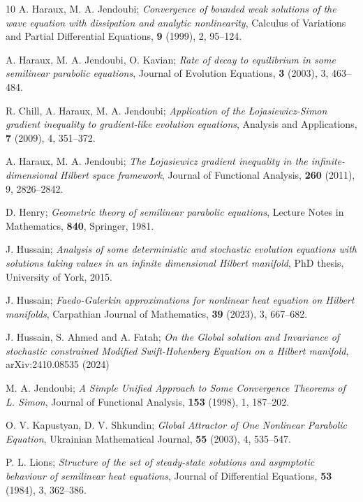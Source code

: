 \documentclass[reqno]{amsart}
\begin{document}
\begin{thebibliography}{10}
 A. Haraux, M. A. Jendoubi;
\emph{Convergence of bounded weak solutions of the wave equation with dissipation
and analytic nonlinearity}, Calculus of Variations and Partial Differential Equations,
\textbf{9} (1999), 2, 95--124.

 A. Haraux, M. A. Jendoubi, O. Kavian;
\emph{Rate of decay to equilibrium in some semilinear parabolic equations},
Journal of Evolution Equations, \textbf{3} (2003), 3, 463--484.

 R. Chill, A. Haraux, M. A. Jendoubi;
\emph{Application of the \L{o}jasiewicz-Simon gradient inequality to gradient-like
evolution equations}, Analysis and Applications, \textbf{7} (2009), 4, 351--372.

 A. Haraux, M. A. Jendoubi;
\emph{The \L{o}jasiewicz gradient inequality in the infinite-dimensional Hilbert
space framework}, Journal of Functional Analysis, \textbf{260} (2011), 9, 2826--2842.

 D. Henry;
\emph{Geometric theory of semilinear parabolic equations},
Lecture Notes in Mathematics, \textbf{840}, Springer, 1981.

 J. Hussain;
\emph{Analysis of some deterministic and stochastic evolution equations with
solutions taking values in an infinite dimensional Hilbert manifold},
PhD thesis, University of York, 2015.

 J. Hussain;
\emph{Faedo-Galerkin approximations for nonlinear heat equation on Hilbert manifolds},
 Carpathian Journal of Mathematics, \textbf{39}  (2023), 3, 667--682.

 J. Hussain, S. Ahmed and A. Fatah;
\emph{On the Global solution and Invariance of stochastic constrained Modified
Swift-Hohenberg Equation on a Hilbert manifold}, arXiv:2410.08535 (2024)

 M. A. Jendoubi;
\emph{A Simple Unified Approach to Some Convergence Theorems of L. Simon},
Journal of Functional Analysis, \textbf{153} (1998), 1, 187--202.

 O. V. Kapustyan, D. V. Shkundin;
\emph{Global Attractor of One Nonlinear Parabolic Equation},
Ukrainian Mathematical Journal, \textbf{55} (2003), 4, 535--547.

 P. L. Lions;
\emph{Structure of the set of steady-state solutions and asymptotic behaviour of
semilinear heat equations}, Journal of Differential Equations, 
\textbf{53}  (1984), 3, 362--386.


\end{thebibliography}
\end{document}
